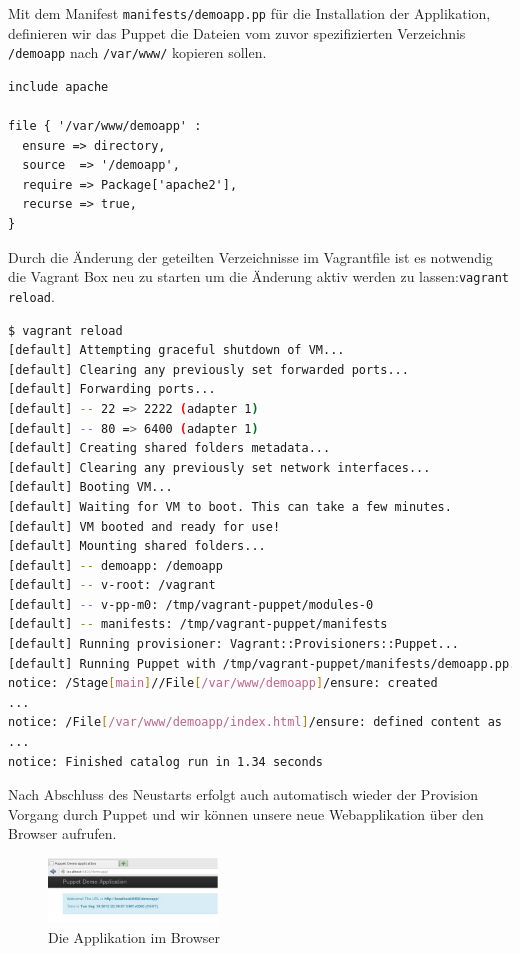 \documentclass[12pt,a4paper,ngerman]{article}
\begin{document}
Mit dem Manifest \lstinline$manifests/demoapp.pp$ für die Installation der Applikation, definieren wir das Puppet die Dateien vom zuvor spezifizierten Verzeichnis \lstinline$/demoapp$ nach \lstinline$/var/www/$ kopieren sollen.
\begin{lstlisting}[language=puppet,caption=Puppet Manifest für die Applikation, label=puppetdemoapp]
include apache

file { '/var/www/demoapp' :
  ensure => directory,
  source  => '/demoapp',
  require => Package['apache2'],
  recurse => true,
}
\end{lstlisting}

Durch die Änderung der geteilten Verzeichnisse im Vagrantfile ist es notwendig die Vagrant Box neu zu starten um die Änderung aktiv werden zu lassen:\lstinline$vagrant reload$.
\begin{lstlisting}[language=sh,caption=Puppet reload mit Provisioning der Applikation, label=reloaddemoapp]
$ vagrant reload
[default] Attempting graceful shutdown of VM...
[default] Clearing any previously set forwarded ports...
[default] Forwarding ports...
[default] -- 22 => 2222 (adapter 1)
[default] -- 80 => 6400 (adapter 1)
[default] Creating shared folders metadata...
[default] Clearing any previously set network interfaces...
[default] Booting VM...
[default] Waiting for VM to boot. This can take a few minutes.
[default] VM booted and ready for use!
[default] Mounting shared folders...
[default] -- demoapp: /demoapp
[default] -- v-root: /vagrant
[default] -- v-pp-m0: /tmp/vagrant-puppet/modules-0
[default] -- manifests: /tmp/vagrant-puppet/manifests
[default] Running provisioner: Vagrant::Provisioners::Puppet...
[default] Running Puppet with /tmp/vagrant-puppet/manifests/demoapp.pp...
notice: /Stage[main]//File[/var/www/demoapp]/ensure: created
...
notice: /File[/var/www/demoapp/index.html]/ensure: defined content as '{md5}90a8d419b9c7b43b09ba73abebaf8f4c'
...
notice: Finished catalog run in 1.34 seconds
\end{lstlisting}

Nach Abschluss des Neustarts erfolgt auch automatisch wieder der Provision Vorgang durch Puppet und wir können unsere neue Webapplikation über den Browser aufrufen.
\begin{figure}
  \begin{center}
    \includegraphics[width=0.4\textwidth]{images/demoapp.pdf}
  \end{center}
  \caption{Die Applikation im Browser}
  \label{demoapp}
\end{figure}
\end{document}
